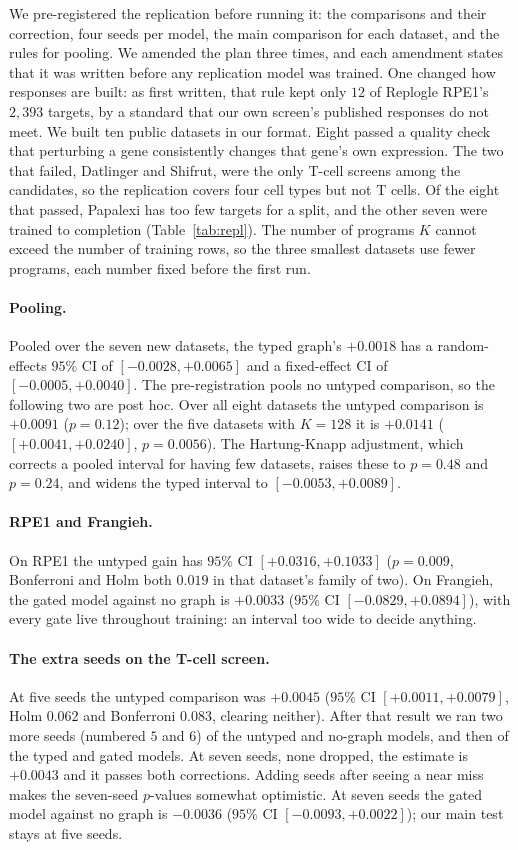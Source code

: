 \documentclass{article}
\begin{document}
We pre-registered the replication before running it: the comparisons and their correction, four seeds per
model, the main comparison for each dataset, and the rules for pooling. We amended the plan three times,
and each amendment states that it was written before any replication model was trained. One changed how
responses are built: as first written, that rule kept only $12$ of Replogle RPE1's $2{,}393$ targets, by a
standard that our own screen's published responses do not meet. We built ten
public datasets in our format. Eight passed a quality check that perturbing a gene consistently changes
that gene's own expression. The two that failed, Datlinger and Shifrut, were the only T-cell screens among
the candidates, so the replication covers four cell types but not T cells. Of the eight that passed,
Papalexi has too few targets for a split, and the other seven were trained to completion
(Table~\ref{tab:repl}). The number of programs $K$ cannot exceed the number of training rows, so the three
smallest datasets use fewer programs, each number fixed before the first run.

\paragraph{Pooling.} Pooled over the seven new datasets, the typed graph's $+0.0018$ has a random-effects
$95\%$ CI of $[-0.0028,+0.0065]$ and a fixed-effect CI of $[-0.0005,+0.0040]$. The pre-registration pools
no untyped comparison, so the following two are post hoc. Over all eight datasets the untyped comparison is
$+0.0091$ ($p{=}0.12$); over the five datasets with $K{=}128$ it is $+0.0141$ ($[+0.0041,+0.0240]$,
$p{=}0.0056$). The Hartung-Knapp adjustment, which corrects a pooled interval for having few datasets,
raises these to $p{=}0.48$ and $p{=}0.24$, and widens the typed interval to $[-0.0053,+0.0089]$.

\paragraph{RPE1 and Frangieh.} On RPE1 the untyped gain has $95\%$ CI $[+0.0316,+0.1033]$ ($p{=}0.009$,
Bonferroni and Holm both $0.019$ in that dataset's family of two). On Frangieh, the gated model against no
graph is $+0.0033$ ($95\%$ CI $[-0.0829,+0.0894]$), with every gate live throughout training: an interval
too wide to decide anything.

\paragraph{The extra seeds on the T-cell screen.} At five seeds the untyped comparison was $+0.0045$
($95\%$ CI $[+0.0011,+0.0079]$, Holm $0.062$ and Bonferroni $0.083$, clearing neither). After that result
we ran two more seeds (numbered $5$ and $6$) of the untyped and no-graph models, and then of the typed and
gated models. At
seven seeds, none dropped, the estimate is $+0.0043$ and it passes both corrections. Adding seeds after
seeing a near miss makes the seven-seed $p$-values somewhat optimistic. At seven seeds the gated model
against no graph is $-0.0036$ ($95\%$ CI $[-0.0093,+0.0022]$); our main test stays at five seeds.
\end{document}
